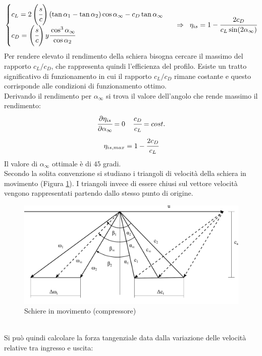 \begin{align*}
\begin{cases}
c_L = 2 \left(  \cfrac{s}{c} \right) (\tan \alpha_1 - \tan \alpha_2) \cos \alpha_{\infty} - c_D \tan \alpha_{\infty}\\
c_D= \left(  \cfrac{s}{c} \right) y \cfrac{\cos^3 \alpha_{\infty}}{\cos \alpha_2}
\end{cases}
\;\; \Rightarrow \;\;
\eta_{is} = 1- \cfrac{2 c_D}{c_L \sin (2 \alpha_{\infty})}
\end{align*}
Per rendere elevato il rendimento della schiera bisogna cercare il massimo del rapporto $c_L/c_D$, che rappresenta quindi l'efficienza del profilo. Esiste un tratto significativo di funzionamento in cui il rapporto $c_L/c_D$ rimane costante e questo corrisponde alle condizioni di funzionamento ottimo.\\
Derivando il rendimento per $\alpha_{\infty}$ si trova il valore dell'angolo che rende massimo il rendimento:
\begin{align*}
\cfrac{\partial \eta_{is}}{\partial \alpha_{\infty}} = 0 \;\;\;\; \cfrac{c_D}{c_L} = cost.
\end{align*}
\begin{align*}
\eta_{is,max} = 1- \cfrac{2 c_D}{c_L}
\end{align*}
Il valore di $\alpha_{\infty}$ ottimale è di $45$ gradi.\\
Secondo la solita convenzione si studiano i triangoli di velocità della schiera in movimento (Figura \ref{fig:SchiereCompr}). I triangoli invece di essere chiusi sul vettore velocità vengono rappresentati partendo dallo stesso punto di origine. 
\begin{figure}
\centering
  \includegraphics[width=\textwidth]{fig/SchiereCompr.pdf}
\caption{Schiere in movimento (compressore)}
\label{fig:SchiereCompr}
\end{figure}
\\Si può quindi calcolare la forza tangenziale data dalla variazione delle velocità relative tra ingresso e uscita:

